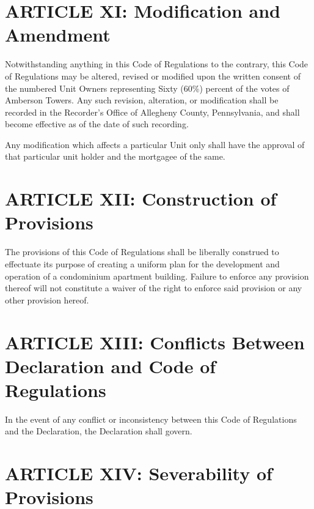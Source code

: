 \documentclass[
]{book}
\begin{document}
\hypertarget{article-xi-modification-and-amendment}{%
\section*{ARTICLE XI: Modification and Amendment}\label{article-xi-modification-and-amendment}}

Notwithstanding anything in this Code of Regulations to the contrary, this Code of Regulations may be altered, revised or modified upon the written consent of the numbered Unit Owners representing Sixty (60\%) percent of the votes of Amberson Towers. Any such revision, alteration, or modification shall be recorded in the Recorder's Office of Allegheny County, Pennsylvania, and shall become effective as of the date of such recording.

Any modification which affects a particular Unit only shall have the approval of that particular unit holder and the mortgagee of the same.

\hypertarget{article-xii-construction-of-provisions}{%
\section*{ARTICLE XII: Construction of Provisions}\label{article-xii-construction-of-provisions}}

The provisions of this Code of Regulations shall be liberally construed to effectuate its purpose of creating a uniform plan for the development and operation of a condominium apartment building. Failure to enforce any provision thereof will not constitute a waiver of the right to enforce said provision or any other provision hereof.

\hypertarget{article-xiii-conflicts-between-declaration-and-code-of-regulations}{%
\section*{ARTICLE XIII: Conflicts Between Declaration and Code of Regulations}\label{article-xiii-conflicts-between-declaration-and-code-of-regulations}}

In the event of any conflict or inconsistency between this Code of Regulations and the Declaration, the Declaration shall govern.

\hypertarget{article-xiv-severability-of-provisions}{%
\section*{ARTICLE XIV: Severability of Provisions}\label{article-xiv-severability-of-provisions}}
\end{document}
